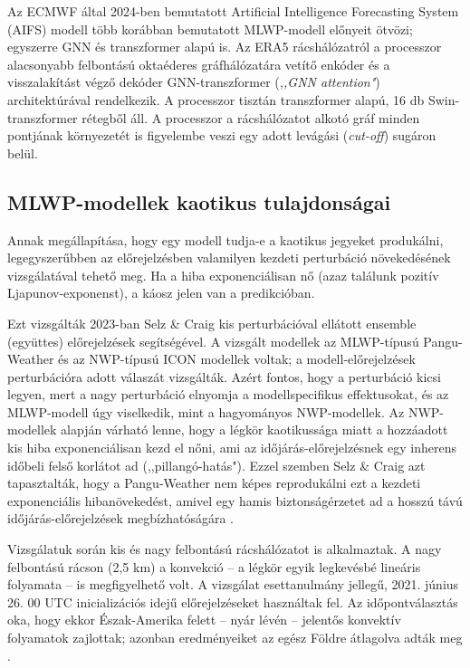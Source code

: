 \documentclass[12pt,a4paper]{article}
\begin{document}
Az ECMWF által 2024-ben bemutatott Artificial Intelligence Forecasting System (AIFS) modell több korábban bemutatott MLWP-modell előnyeit ötvözi; egyszerre GNN és transzformer alapú is. Az ERA5 rácshálózatról a processzor alacsonyabb felbontású oktaéderes gráfhálózatára vetítő enkóder és a visszalakítást végző dekóder GNN-transzformer (\textit{,,GNN attention"}) architektúrával rendelkezik. A processzor tisztán transzformer alapú, 16 db Swin-transzformer rétegből áll. A processzor a rácshálózatot alkotó gráf minden pontjának környezetét is figyelembe veszi egy adott levágási (\textit{cut-off}) sugáron belül.

\subsection{MLWP-modellek kaotikus tulajdonságai}

Annak megállapítása, hogy egy modell tudja-e a kaotikus jegyeket produkálni, legegyszerűbben az előrejelzésben valamilyen kezdeti perturbáció növekedésének vizsgálatával tehető meg. Ha a hiba exponenciálisan nő (azaz találunk pozitív Ljapunov-exponenst), a káosz jelen van a predikcióban.

Ezt vizsgálták 2023-ban Selz \& Craig kis perturbációval ellátott ensemble (együttes) előrejelzések segítségével. A vizsgált modellek az MLWP-típusú Pangu-Weather és az NWP-típusú ICON modellek voltak; a modell-előrejelzések perturbációra adott válaszát vizsgálták. Azért fontos, hogy a perturbáció kicsi legyen, mert a nagy perturbáció elnyomja a modellspecifikus effektusokat, és az MLWP-modell úgy viselkedik, mint a hagyományos NWP-modellek. Az NWP-modellek alapján várható lenne, hogy a légkör kaotikussága miatt a hozzáadott kis hiba exponenciálisan kezd el nőni, ami az időjárás-előrejelzésnek egy inherens időbeli felső korlátot ad (,,pillangó-hatás"). Ezzel szemben Selz \& Craig azt tapasztalták, hogy a Pangu-Weather nem képes reprodukálni ezt a kezdeti exponenciális hibanövekedést, amivel egy hamis biztonságérzetet ad a hosszú távú időjárás-előrejelzések megbízhatóságára \cite{selz_can_2023}.

Vizsgálatuk során kis és nagy felbontású rácshálózatot is alkalmaztak. A nagy felbontású rácson (2,5 km) a konvekció -- a légkör egyik legkevésbé lineáris folyamata -- is megfigyelhető volt. A vizsgálat esettanulmány jellegű, 2021. június 26. 00 UTC inicializációs idejű előrejelzéseket használtak fel. Az időpontválasztás oka, hogy ekkor Észak-Amerika felett -- nyár lévén -- jelentős konvektív folyamatok zajlottak; azonban eredményeiket az egész Földre átlagolva adták meg \cite{selz_can_2023}.
\end{document}
